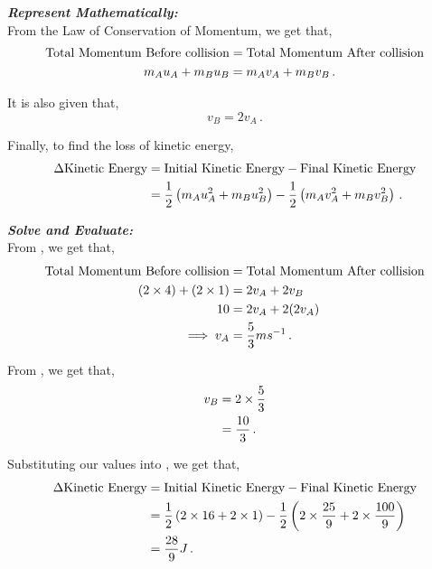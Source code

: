 \begin{subquestions}
\begin{subsubquestions}
\textbf{\textit{Represent Mathematically:}} \\
From the Law of Conservation of Momentum, we get that,
\begin{align}
	\text{Total Momentum Before collision} & = \text{Total Momentum After collision} \nonumber \\
	m_Au_A + m_Bu_B & = m_Av_A+m_Bv_B \label{2008M:q5:MomEqn1}\,.
\end{align}

It is also given that,
\begin{equation}
	v_B=2v_A \label{2008M:q5:Speed1} \,.
\end{equation}

Finally, to find the loss of kinetic energy,
\begin{align}
	\Delta \text{Kinetic Energy} & = \text{Initial Kinetic Energy} - \text{Final Kinetic Energy} \nonumber \\
	                             & = \frac{1}{2}\left(m_Au_A^2+m_Bu_B^2\right) - \frac{1}{2}\left(m_Av_A^2+m_Bv_B^2\right) \label{2008M:q5:KEEqn1} \,.
\end{align}



\textbf{\textit{Solve and Evaluate:}} \\
From , we get that,
\begin{align}
	\text{Total Momentum Before collision} & = \text{Total Momentum After collision} \nonumber \\
	(2\times 4) + (2\times 1) & = 2v_A+2v_B \nonumber \\
	10 & = 2v_A+2(2v_A) \nonumber \\
	\implies v_A & = \frac{5}{3}ms^{-1} \,.
\end{align}
	
From , we get that,
\begin{align}
	v_B & = 2\times \frac{5}{3} \nonumber \\
	    & = \frac{10}{3} \,.
\end{align}
	
Substituting our values into , we get that,
\begin{align}
	\Delta \text{Kinetic Energy} & = \text{Initial Kinetic Energy} - \text{Final Kinetic Energy} \nonumber \\
								 & = \frac{1}{2}\left(2\times 16 + 2\times 1\right) - \frac{1}{2}\left(2\times \frac{25}{9}+ 2\times \frac{100}{9}\right) \nonumber \\
								 & = \frac{28}{9} J \,.
\end{align}
	

\end{subsubquestions}
\end{subquestions}
